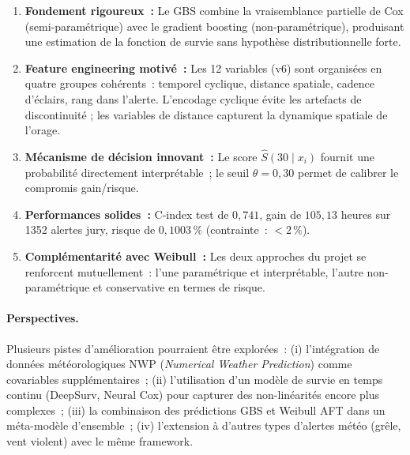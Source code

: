 \documentclass[a4paper,11pt]{article}
\begin{document}
\begin{tcolorbox}[keystyle, title={Bilan de l'approche GBS}]
\begin{enumerate}[leftmargin=1.5em, label=\textbf{\arabic*.}]
  \item \textbf{Fondement rigoureux~:} Le GBS combine la vraisemblance partielle de Cox
    (semi-paramétrique) avec le gradient boosting (non-paramétrique), produisant une estimation
    de la fonction de survie sans hypothèse distributionnelle forte.

  \item \textbf{Feature engineering motivé~:} Les 12 variables (v6) sont organisées en quatre
    groupes cohérents~: temporel cyclique, distance spatiale, cadence d'éclairs, rang dans l'alerte.
    L'encodage cyclique évite les artefacts de discontinuité ; les variables de distance capturent
    la dynamique spatiale de l'orage.

  \item \textbf{Mécanisme de décision innovant~:} Le score $\hat{S}(30 \mid x_i)$ fournit
    une probabilité directement interprétable~; le seuil $\theta = 0{,}30$ permet de calibrer
    le compromis gain/risque.

  \item \textbf{Performances solides~:} C-index test de $0{,}741$, gain de $105{,}13$ heures
    sur 1352 alertes jury, risque de $0{,}1003\,\%$ (contrainte~: $< 2\,\%$).

  \item \textbf{Complémentarité avec Weibull~:} Les deux approches du projet se renforcent
    mutuellement~: l'une paramétrique et interprétable, l'autre non-paramétrique et conservative
    en termes de risque.
\end{enumerate}
\end{tcolorbox}

\medskip

\paragraph{Perspectives.} Plusieurs pistes d'amélioration pourraient être explorées~: (i)
l'intégration de données météorologiques NWP (\emph{Numerical Weather Prediction}) comme
covariables supplémentaires~; (ii) l'utilisation d'un modèle de survie en temps continu
(DeepSurv, Neural Cox) pour capturer des non-linéarités encore plus complexes~; (iii) la
combinaison des prédictions GBS et Weibull AFT dans un méta-modèle d'ensemble~; (iv) l'extension
à d'autres types d'alertes météo (grêle, vent violent) avec le même framework.
\end{document}
